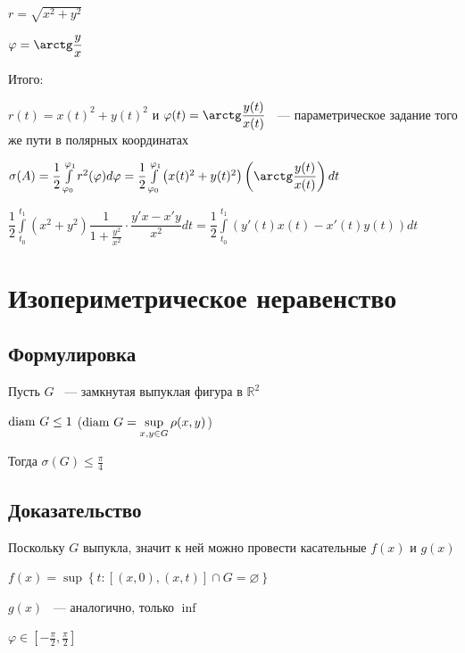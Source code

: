\documentclass{article}
\begin{document}
            $r = \sqrt{x^2 + y^2}$
            
            $\varphi = \arctg \dfrac{y}{x}$
            
            Итого:
            
            $r(t) = x(t)^2 + y(t)^2$ и $\varphi(t) = \arctg \dfrac{y(t)}{x(t)}$ ~--- параметрическое задание того же пути в полярных координатах
            
            $\sigma (A) = \dfrac{1}{2} \int\limits^{\varphi_1}_{\varphi_0} r^2(\varphi) d \varphi = \dfrac{1}{2} \int\limits^{\varphi_1}_{\varphi_0} \left(x(t)^2 + y(t)^2 \right) \left( \arctg \dfrac{y(t)}{x(t)} \right) dt$
            
            $\dfrac{1}{2} \int\limits^{t_1}_{t_0} (x^2 + y^2) \dfrac{1}{1 + \frac{y^2}{x^2}} \cdot \dfrac{y'x - x'y}{x^2} dt = \dfrac{1}{2} \int\limits^{t_1}_{t_0} \left( y'(t) x(t) - x'(t) y(t) \right) dt$
            
    \newpage
    
    \section{Изопериметрическое неравенство}
    
        \subsection{Формулировка}
        
            Пусть $G$ ~--- замкнутая выпуклая фигура в $\mathbb{R}^2$
            
            $\diam G \leq 1$ ($\diam G = \sup\limits_{x, y \in G} \rho(x, y)$)
            
            Тогда $\sigma(G) \leq \frac{\pi}{4}$
            
        \subsection{Доказательство}
        
            Поскольку $G$ выпукла, значит к ней можно провести касательные $f(x)$ и $g(x)$
            
            $f(x) = \sup \left\{ t : [(x, 0), (x, t)] \cap G = \varnothing \right\}$
            
            $g(x)$ ~--- аналогично, только $\inf$
            
            $\varphi \in \left[ -\frac{\pi}{2}, \frac{\pi}{2} \right]$
            
\end{document}
